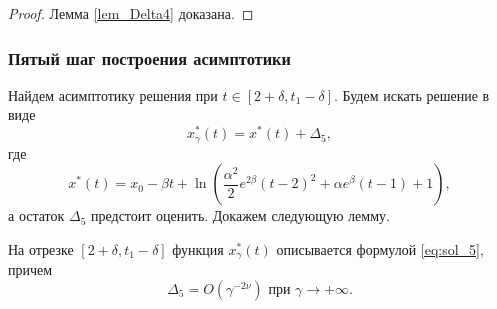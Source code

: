 \begin{proof}
Лемма \ref{lem_Delta4} доказана.

\end{proof}



\subsubsection{Пятый шаг построения асимптотики}

Найдем асимптотику решения при $t \in [2 + \delta, t_1 - \delta]$. Будем искать решение в виде
\begin{equation}
	\label{eq:sol_5}
	x_\gamma^*(t) = x^*(t) + \Delta_5,
\end{equation}
%
где 
\[x^*(t) = x_0 - \beta t + \ln\left(\frac{\alpha^2}{2} e^{2\beta} (t - 2)^2 + \alpha e^{\beta}(t - 1) + 1 \right),\]
а остаток $\Delta_5$ предстоит оценить. Докажем следующую лемму.
%
\begin{lemma}
\label{lem_Delta5}
На отрезке $[2 + \delta, t_1 - \delta]$ функция $x_\gamma^*(t)$ описывается формулой \eqref{eq:sol_5}, причем
\[
\Delta_5 = O(\gamma^{-2\nu}) \text{ при } \gamma \to +\infty.
\]
\end{lemma}
